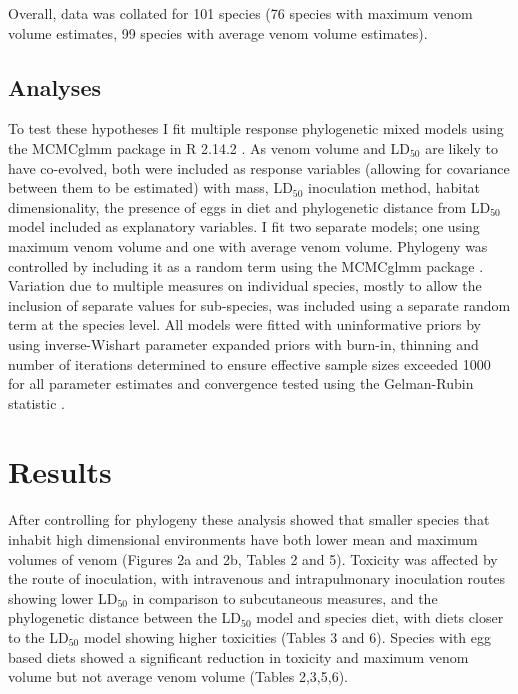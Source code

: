Overall, data was collated for 101 species (76 species with maximum venom volume estimates, 99 species with average venom volume estimates).


\subsection{Analyses}

To test these hypotheses I fit multiple response phylogenetic mixed models using the MCMCglmm package \citep{hadfield2010mcmc} in R 2.14.2 \citep{RCran}. As venom volume and LD$_{50}$ are likely to have co-evolved, both were included as response variables (allowing for covariance between them to be estimated) with mass, LD$_{50}$ inoculation method, habitat dimensionality, the presence of eggs in diet and phylogenetic distance from LD$_{50}$ model included as explanatory variables. I fit two separate models; one using maximum venom volume and one with average venom volume. Phylogeny was controlled by including it as a random term using the MCMCglmm package \citep{hadfield2010mcmc}. Variation due to multiple measures on individual species, mostly to allow the inclusion of separate values for sub-species, was included using a separate random term at the species level. All models were fitted with uninformative priors by using inverse-Wishart parameter expanded priors \citep{hadfield2010mcmc} with burn-in, thinning and number of iterations determined to ensure effective sample sizes exceeded 1000 for all parameter estimates and convergence tested using the Gelman-Rubin statistic \citep{gelman1992inference}. 

\section{Results}

After controlling for phylogeny these analysis showed that smaller species that inhabit high dimensional environments have both lower mean and maximum volumes of venom (Figures 2a and 2b, Tables 2 and 5). Toxicity was affected by the route of inoculation, with intravenous and intrapulmonary inoculation routes showing lower LD$_{50}$ in comparison to subcutaneous measures, and the phylogenetic distance between the LD$_{50}$ model and species diet, with diets closer to the LD$_{50}$ model showing higher toxicities (Tables 3 and 6). Species with egg based diets showed a significant reduction in toxicity and maximum venom volume but not average venom volume (Tables 2,3,5,6).




